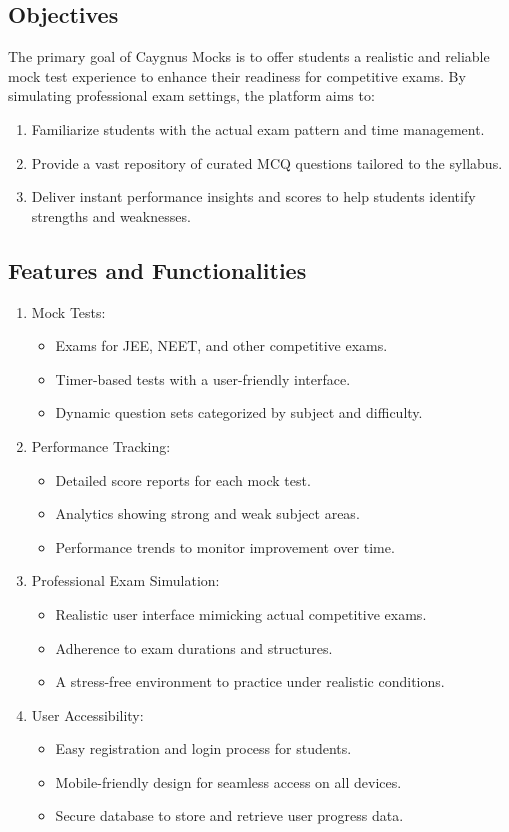 \subsection*{Objectives}
The primary goal of Caygnus Mocks is to offer students a realistic and reliable mock test experience to enhance their readiness for competitive exams. By simulating professional exam settings, the platform aims to:
\begin{enumerate}
	\item Familiarize students with the actual exam pattern and time management.
	\item Provide a vast repository of curated MCQ questions tailored to the syllabus.
	\item Deliver instant performance insights and scores to help students identify strengths and weaknesses.
\end{enumerate}
\subsection*{Features and Functionalities}
\begin{enumerate}
\item Mock Tests:
	\begin{itemize}
\item Exams for JEE, NEET, and other competitive exams.
\item Timer-based tests with a user-friendly interface.
\item Dynamic question sets categorized by subject and difficulty.
	\end{itemize}
\item Performance Tracking:
\begin{itemize}
\item Detailed score reports for each mock test.
\item Analytics showing strong and weak subject areas.
\item Performance trends to monitor improvement over time.
\end{itemize}
\item Professional Exam Simulation:
\begin{itemize}
\item Realistic user interface mimicking actual competitive exams.
\item Adherence to exam durations and structures.
\item A stress-free environment to practice under realistic conditions.
\end{itemize}
\item User Accessibility:
\begin{itemize}
\item Easy registration and login process for students.
\item Mobile-friendly design for seamless access on all devices.
\item Secure database to store and retrieve user progress data.
\end{itemize}
\end{enumerate}
